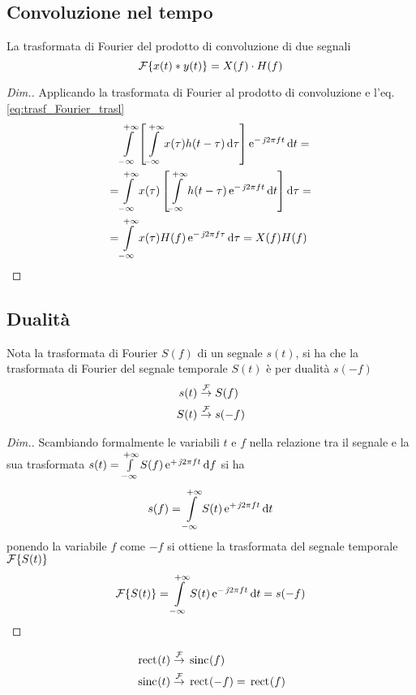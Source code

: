 \subsection{Convoluzione nel tempo}
La trasformata di Fourier del prodotto di convoluzione di due segnali
\begin{equation}
\operatorname{\mathcal{F}}\!\left\lbrace{x(t)\ast y(t)}\right\rbrace=X(f)\cdot H(f)
\label{eq:trasf_Fourier_conv}
\end{equation}
\begin{proof}[Dim.] Applicando la trasformata di Fourier al prodotto di convoluzione e l'eq.\ref{eq:trasf_Fourier_trasl}
\begin{align*}
&\intinf{ \left[\intinf{x(\tau)h(t-\tau)}{\tau}\right] \e{-\imath 2\pi f t}}{t}=\\
=&\intinf{ x(\tau) \left[\intinf{h(t-\tau)\e{-\imath 2\pi f t}}{t}\right]}{\tau}=\\
=&\intinf{ x(\tau) H(f)\e{-\imath 2\pi f \tau}}{\tau}= X(f) H(f)
\qedhere
\end{align*}
\end{proof}

\subsection{Dualità}
Nota la trasformata di Fourier $S(f)$ di un segnale $s(t)$, si ha che la trasformata di Fourier del segnale temporale $S(t)$ è per dualità $s(-f)$
\begin{equation}
\begin{split}
s(t) &\overset{\operatorname{\mathcal{F}}}{\to} S(f) \\
S(t) &\overset{\operatorname{\mathcal{F}}}{\to} s(-f)
\end{split}
\end{equation}
\begin{proof}[Dim.]
Scambiando formalmente le variabili $t$ e $f$ nella relazione tra il segnale e la sua trasformata $s(t)=\int\limits_{-\infty}^{+\infty}{S(f)\operatorname{e}^{+\operatorname{\mathit{j}\!} 2\pi f t}}{\,\mathop{}\!\mathrm{d}{f}}$ si ha
\[s(f)=\int\limits_{-\infty}^{+\infty}{S(t)\operatorname{e}^{+\operatorname{\mathit{j}\!} 2\pi f t}}{\,\mathop{}\!\mathrm{d}{t}}\]
ponendo la variabile $f$ come $-f$ si ottiene la trasformata del segnale temporale $\operatorname{\mathcal{F}}\!\left\lbrace{S(t)}\right\rbrace$
\[\operatorname{\mathcal{F}}\!\left\lbrace{S(t)}\right\rbrace=\int\limits_{-\infty}^{+\infty}{S(t)\operatorname{e}^{-\operatorname{\mathit{j}\!} 2\pi f t}}{\,\mathop{}\!\mathrm{d}{t}}=s(-f)\qedhere\]
\end{proof}

\begin{esempio}
\begin{equation}
\begin{split}
\,{\operatorname{rect}}^{}\!\left({t}\right) &\overset{\operatorname{\mathcal{F}}}{\to} \,{\operatorname{sinc}}^{}\!\left({f}\right)\\
\,{\operatorname{sinc}}^{}\!\left({t}\right) &\overset{\operatorname{\mathcal{F}}}{\to} \,{\operatorname{rect}}^{}\!\left({-f}\right)=\,{\operatorname{rect}}^{}\!\left({f}\right)
\end{split}
\end{equation}
\end{esempio}

